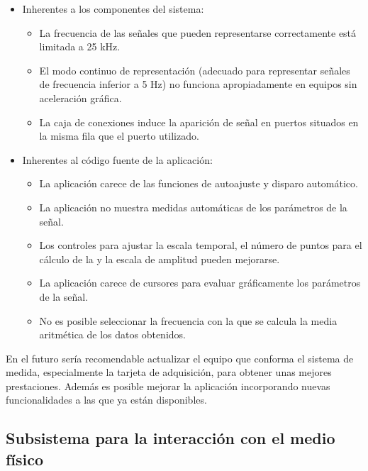 \begin{itemize}
    \item Inherentes a los componentes del sistema:
	\begin{itemize}
	    \item La frecuencia de las señales que pueden representarse
		correctamente está limitada a 25 kHz.
	    \item El modo continuo de representación (adecuado para
		representar señales de frecuencia inferior a 5 Hz) no
		funciona apropiadamente en equipos sin aceleración gráfica.
	    \item La caja de conexiones induce la aparición de señal en
		puertos situados en la misma fila que el puerto utilizado.
	\end{itemize}
    \item Inherentes al código fuente de la aplicación:
	\begin{itemize}
	    \item La aplicación carece de las funciones de autoajuste y
		disparo automático.
	    \item La aplicación no muestra medidas automáticas de los
		parámetros de la señal.
	    \item Los controles para ajustar la escala temporal, el número
		de puntos para el cálculo de la  y la escala de
		amplitud pueden mejorarse.
	    \item La aplicación carece de cursores para evaluar
		gráficamente los parámetros de la señal.
	    \item No es posible seleccionar la frecuencia con la que se
		calcula la media aritmética de los datos obtenidos.
	\end{itemize}
\end{itemize}

En el futuro sería recomendable actualizar el equipo que conforma el
sistema de medida, especialmente la tarjeta de adquisición, para obtener
unas mejores prestaciones. Además es posible mejorar la aplicación
incorporando nuevas funcionalidades a las que ya están disponibles.


\subsection{Subsistema para la interacción con el medio
físico}\label{subsec:transducerconclusions}

